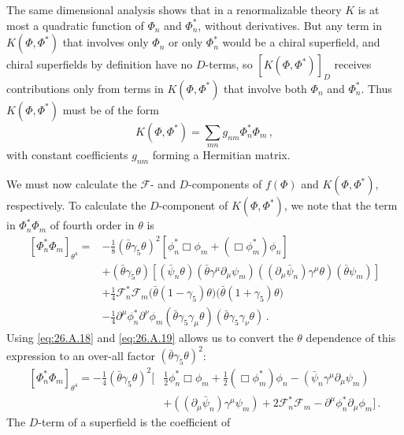 The same dimensional analysis shows that in a renormalizable theory \(K\) is at
most a quadratic function of \(\Phi_n\) and \(\Phi_n^*\), without derivatives.
But any term in \(K(\Phi,\Phi^*)\) that involves only \(\Phi_n\) or only
\(\Phi_n^*\) would be a chiral superfield, and chiral superfields by definition
have no \(D\)-terms, so \([K(\Phi,\Phi^*)]_D\) receives contributions only from
terms in \(K(\Phi,\Phi^*)\) that involve both \(\Phi_n\) and \(\Phi_n^*\). Thus
\(K(\Phi,\Phi^*)\) must be of the form
\begin{equation}
  K(\Phi,\Phi^*)=\sum_{mn}g_{nm}\Phi_n^*\Phi_m\,,
  \tag{26.4.1}\label{eq:26.4.1}
\end{equation}
with constant coefficients \(g_{nm}\) forming a Hermitian matrix.

We must now calculate the \(\mathcal{F}\)- and \(D\)-components of \(f(\Phi)\)
and \(K(\Phi,\Phi^*)\), respectively. To calculate the \(D\)-component of
\(K(\Phi,\Phi^*)\), we note that the term in \(\Phi_n^*\Phi_m\) of fourth order
in \(\theta\) is
\[
  \begin{aligned}
  [\Phi_n^*\Phi_m]_{\theta^4}
  ={}&-\frac18(\bar\theta\gamma_5\theta)^2
    \left[\phi_n^*\Box\phi_m+(\Box\phi_m^*)\phi_n\right]
  \\
  &+(\bar\theta\gamma_5\theta)
    \left[
      (\bar\psi_n\theta)(\bar\theta\gamma^\mu\partial_\mu\psi_m)
      ((\partial_\mu\bar\psi_n)\gamma^\mu\theta)(\bar\theta\psi_m)
    \right]
  \\
  &+\frac14\mathcal{F}_n^*\mathcal{F}_m
    \bigl(\bar\theta(1-\gamma_5)\theta\bigr)
    \bigl(\bar\theta(1+\gamma_5)\theta\bigr)
  \\
  &-\frac14\partial^\mu\phi_n^*\partial^\nu\phi_m
    (\bar\theta\gamma_5\gamma_\mu\theta)
    (\bar\theta\gamma_5\gamma_\nu\theta)\,.
  \end{aligned}
\]
Using \eqref{eq:26.A.18} and \eqref{eq:26.A.19} allows us to convert the
\(\theta\) dependence of this expression to an over-all factor
\((\bar\theta\gamma_5\theta)^2\):
\[
  \begin{aligned}
  [\Phi_n^*\Phi_m]_{\theta^4}
  =-\frac14(\bar\theta\gamma_5\theta)^2
  \biggl[
    &\frac12\phi_n^*\Box\phi_m
    +\frac12(\Box\phi_m^*)\phi_n
    -(\bar\psi_n\gamma^\mu\partial_\mu\psi_m)
  \\
    &+((\partial_\mu\bar\psi_n)\gamma^\mu\psi_m)
    +2\mathcal{F}_n^*\mathcal{F}_m
    -\partial^\mu\phi_n^*\partial_\mu\phi_m
  \biggr]\,.
  \end{aligned}
\]
The \(D\)-term of a superfield is the coefficient of
